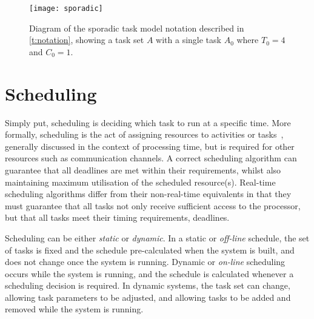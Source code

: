 \begin{figure}[t]
	\begin{center}
		\leavevmode
		\texttt{[image: sporadic]}
        \caption[Diagram of the sporadic task model.]{Diagram of the sporadic task model notation described in \cref{t:notation}, showing
        a task set $A$ with a single task $A_{0}$ where $T_{0} = 4$ and $C_{0} = 1$.}
		\label{fig:fp-schedule}
	\end{center}
\end{figure}


\section{Scheduling}
\label{sec:rt-scheduling}

Simply put, scheduling is deciding which task to run at a specific time. More formally, scheduling
is the act of assigning resources to activities or tasks~\citep{Baruah_CPV_96}, generally discussed
in the context of processing time, but is required for other resources such as communication
channels.  A correct scheduling algorithm  can guarantee that all deadlines are met within their
requirements, whilst also maintaining maximum utilisation of the scheduled resource(s). Real-time
scheduling algorithms differ from their non-real-time equivalents in that they must guarantee that
all tasks not only receive sufficient access to the processor, but that all tasks meet their timing
requirements, \ie deadlines. 

Scheduling can be either \emph{static} or \emph{dynamic}. In a static or \emph{off-line} schedule, 
the set of tasks is fixed and the schedule pre-calculated when the system is built, and does not
change once the system is running. 
Dynamic or \emph{on-line} scheduling occurs while the system is running, and the schedule is
calculated whenever a scheduling decision is required. In dynamic systems, the task set can change,
allowing task parameters to be adjusted, and allowing tasks to be added and removed while the system
is running.

